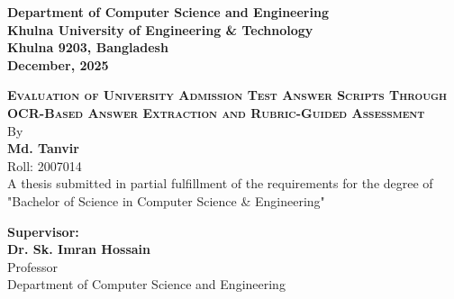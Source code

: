\documentclass[12pt]{article}
\begin{document}
\begin{titlepage}
\begin{center}
    {\fontsize{12}{1.5}\selectfont \textbf{Department of Computer Science and Engineering}}\\
    {\fontsize{12}{1.5}\selectfont \textbf{Khulna University of Engineering \& Technology}}\\
    {\fontsize{12}{1.5}\selectfont \textbf{Khulna 9203, Bangladesh}}\\
    {\fontsize{12}{1.5}\selectfont \textbf{December, 2025}}\\
    \newpage
    
    {\fontsize{18}{1.5}\selectfont \textbf{\textsc{Evaluation of University Admission Test Answer Scripts Through OCR-Based Answer Extraction and Rubric-Guided Assessment}}}\\
    \vspace{12pt}
    \vspace{12pt}
    \vspace{12pt}
    {\fontsize{12}{1.5}\selectfont By}\\
    \vspace{12pt}
    \vspace{12pt}
    {\fontsize{12}{1.5}\selectfont \textbf{Md. Tanvir}}\\
    \vspace{12pt}
    {\fontsize{12}{1.5}\selectfont Roll: 2007014}\\
    \vspace{12pt}
    \vspace{12pt}
    {\fontsize{12}{1.5}\selectfont A thesis submitted in partial fulfillment of the requirements for the degree of \\
    "Bachelor of Science in Computer Science \& Engineering" }\\
    \vspace{12pt}
    \vspace{12pt}
    \begin{flushleft}
    {\fontsize{12}{1.5}\selectfont \textbf{Supervisor:}}\\
    \hspace*{0.8in} %
    {\fontsize{12}{1.5}\selectfont \textbf{Dr. Sk. Imran Hossain}}\\
    \hspace*{0.8in} %
    {\fontsize{12}{1.5}\selectfont Professor}\\
    \hspace*{0.8in} %
    {\fontsize{12}{1.5}\selectfont Department of Computer Science and Engineering \hspace{.65in}}\\

\end{flushleft}
\end{center}
\end{titlepage}
\end{document}
